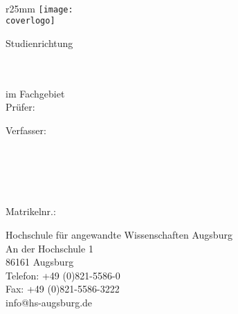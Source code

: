 \thispagestyle{plain}
\begin{titlepage}
  \thispagestyle{empty}  
  \addtolength{\textwidth}{55mm}
  \addtolength{\oddsidemargin}{-18mm}
  
  ~
  \begin{wrapfigure}{r}{25mm}
    \vspace{-40mm}
    \texttt{[image: \\coverlogo]}
  \end{wrapfigure}
  
  
  \vspace{-1mm}
  
  \huge{\textcolor{HSAorange}{\selectfont\art}}
  
  
  \vspace{10mm}
  \Large{Studienrichtung \linebreak \studienbereich}
  \vspace{20mm}
  
  
  \begin{minipage}[t]{0.6\textwidth}
    \Large{\textbf{\titel}}\\[1.2ex]
    \large{\textbf{\untertitel}}\\
    \linebreak
    \large{im Fachgebiet \fachgebiet}\\
    \linebreak
    \linebreak
    \large{Prüfer: \pruefer}\\
    
  \end{minipage}
  \hspace{0.1\textwidth}
  \hspace{5mm}
  \begin{minipage}[t]{40mm}
    \scriptsize
    Verfasser:\\
    \autor\\
    \addresse\\
    \plz\ \ort\\
    \telefon\\
    \mail\\
    Matrikelnr.: \matrikelnr\\
    
    \vspace{15mm}
    
    \textcolor{HSAred}{Hochschule für angewandte Wissenschaften Augsburg}\\
    \textcolor{HSAred}{An der Hochschule 1}\\
    \textcolor{HSAred}{86161 Augsburg}\\
    \textcolor{HSAred}{Telefon: +49 (0)821-5586-0}\\
    \textcolor{HSAred}{Fax: +49 (0)821-5586-3222}\\
    \textcolor{HSAred}{info@hs-augsburg.de}\\
    
  \end{minipage}
\end{titlepage}
